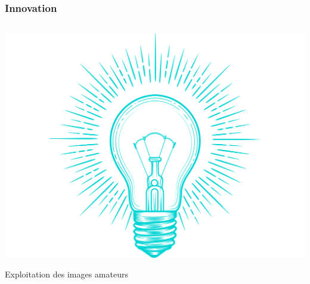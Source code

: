 \begin{frame}
	\frametitle{Innovation}
	\vspace{-0.8cm}
	\begin{columns}[T]
		\begin{block}{}
		\begin{minipage}{.1\textwidth}
		\vspace{-0.3cm}
		\includegraphics[scale=0.03]{Files/fig/innov2.png}
		\end{minipage}
		\hfill
		\begin{minipage}{0.8\textwidth}
		\centering\Large{Exploitation des images amateurs}
		\end{minipage}
		\end{block}
	\end{columns}
	\vspace{0.5cm}
	\centering
\end{frame}


